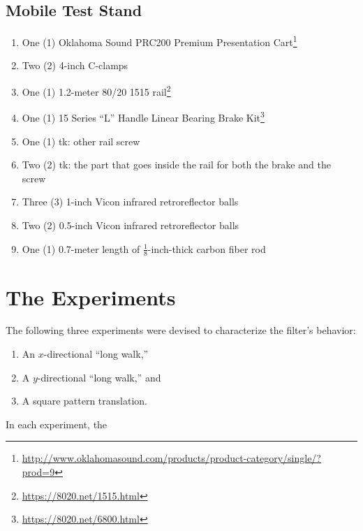 \subsection{Mobile Test Stand}
\begin{enumerate}
\item One (1) Oklahoma Sound PRC200 Premium Presentation Cart\footnote{\url{http://www.oklahomasound.com/products/product-category/single/?prod=9}}
\item Two (2) 4-inch C-clamps
\item One (1) 1.2-meter 80/20 1515 rail\footnote{\url{https://8020.net/1515.html}}
\item One (1) 15 Series ``L'' Handle Linear Bearing Brake Kit\footnote{\url{https://8020.net/6800.html}}
\item One (1) tk: other rail screw
\item Two (2) tk: the part that goes inside the rail for both the brake and the screw
\item Three (3) 1-inch Vicon infrared retroreflector balls
\item Two (2) 0.5-inch Vicon infrared retroreflector balls
\item One (1) 0.7-meter length of $\frac{1}{8}$-inch-thick carbon fiber rod
\end{enumerate}


\section{The Experiments}

The following three experiments were devised to characterize the filter's behavior:
\begin{enumerate}
\item An $x$-directional ``long walk,''
\item A $y$-directional ``long walk,'' and
\item A square pattern translation.
\end{enumerate}
In each experiment, the 